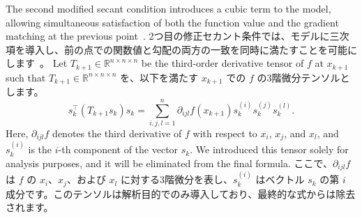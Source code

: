 \documentclass[0_main]{subfiles}
\begin{document}
\ifEn
    The second modified secant condition introduces a cubic term to the model, allowing simultaneous satisfaction of both the function value and the gradient matching at the previous point~\citep{zhangNewQuasiNewtonEquation1999, zhangPropertiesNumericalPerformance2001,yabeLocalSuperlinearConvergence2007}.
\else
    2つ目の修正セカント条件では、モデルに三次項を導入し、前の点での関数値と勾配の両方の一致を同時に満たすことを可能にします~\citep{zhangNewQuasiNewtonEquation1999, zhangPropertiesNumericalPerformance2001,yabeLocalSuperlinearConvergence2007}。
\fi
\ifEn
    Let $T_{k+1} \in \mathbb{R}^{n \times n \times n}$ be the third-order derivative tensor of $f$ at $x_{k+1}$ such that
\else
    $T_{k+1} \in \mathbb{R}^{n \times n \times n}$ を、以下を満たす $x_{k+1}$ での $f$ の3階微分テンソルとします。
\fi
\begin{equation*}
    s_k^\top (T_{k+1} s_k) s_k = \sum_{i,j,l=1}^n \partial_{ijl} f(x_{k+1}) s_k^{(i)} s_k^{(j)} s_k^{(l)}.
\end{equation*}
\ifEn
    Here, $\partial_{ijl} f$ denotes the third derivative of $f$ with respect to $x_i$, $x_j$, and $x_l$, and $s_k^{(i)}$ is the $i$-th component of the vector $s_k$. We introduced this tensor solely for analysis purposes, and it will be eliminated from the final formula.
\else
    ここで、$\partial_{ijl} f$ は $f$ の $x_i$、$x_j$、および $x_l$ に対する3階微分を表し、$s_k^{(i)}$ はベクトル $s_k$ の第 $i$ 成分です。このテンソルは解析目的でのみ導入しており、最終的な式からは除去されます。
\fi
\end{document}
